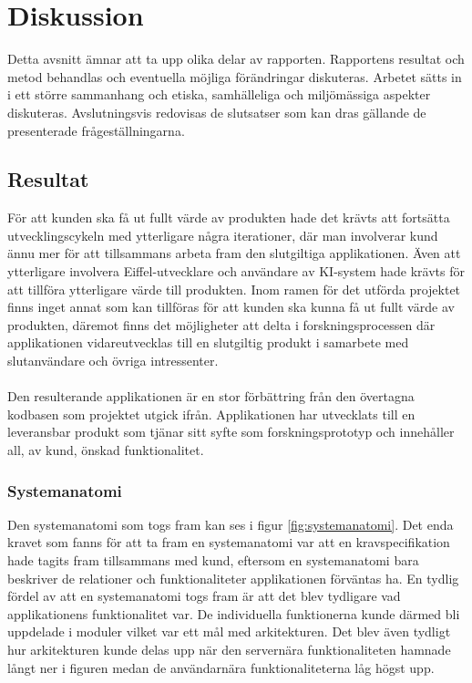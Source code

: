 \chapter{Diskussion}
\label{cha:discussion}	
Detta avsnitt ämnar att ta upp olika delar av rapporten. Rapportens resultat och metod behandlas och eventuella möjliga förändringar diskuteras. Arbetet sätts in i ett större sammanhang och etiska, samhälleliga och miljömässiga aspekter diskuteras. Avslutningsvis redovisas de slutsatser som kan dras gällande de presenterade frågeställningarna.

\section{Resultat}
\label{sec:discussion-results}
För att kunden ska få ut fullt värde av produkten hade det krävts att fortsätta utvecklingscykeln med ytterligare några iterationer, där man involverar kund ännu mer för att tillsammans arbeta fram den slutgiltiga applikationen. Även att ytterligare involvera Eiffel-utvecklare och användare av KI-system hade krävts för att tillföra ytterligare värde till produkten. Inom ramen för det utförda projektet finns inget annat som kan tillföras för att kunden ska kunna få ut fullt värde av produkten, däremot finns det möjligheter att delta i forskningsprocessen där applikationen vidareutvecklas till en slutgiltig produkt i samarbete med slutanvändare och övriga intressenter. \\
\\
Den resulterande applikationen är en stor förbättring från den övertagna kodbasen som projektet utgick ifrån. Applikationen har utvecklats till en leveransbar produkt som tjänar sitt syfte som forskningsprototyp och innehåller all, av kund, önskad funktionalitet.

\subsection{Systemanatomi}
Den systemanatomi som togs fram kan ses i figur \ref{fig:systemanatomi}. Det enda kravet som fanns för att ta fram en systemanatomi var att en kravspecifikation hade tagits fram tillsammans med kund, eftersom en systemanatomi bara beskriver de relationer och funktionaliteter applikationen förväntas ha. En tydlig fördel av att en systemanatomi togs fram är att det blev tydligare vad applikationens funktionalitet var. De individuella funktionerna kunde därmed bli uppdelade i moduler vilket var ett mål med arkitekturen. Det blev även tydligt hur arkitekturen kunde delas upp när den servernära funktionaliteten hamnade långt ner i figuren medan de användarnära funktionaliteterna låg högst upp.

